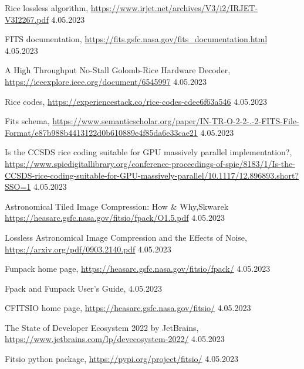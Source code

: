 \documentclass[licencjacka,en]{pracamgr}
\begin{document}
\begin{thebibliography}{99}

         {Rice lossless algorithm},
        \url{https://www.irjet.net/archives/V3/i2/IRJET-V3I2267.pdf} 4.05.2023

         {FITS documentation},
        \url{https://fits.gsfc.nasa.gov/fits_documentation.html} 4.05.2023

         {A High Throughput No-Stall Golomb-Rice Hardware Decoder},
        \url{https://ieeexplore.ieee.org/document/6545997} 4.05.2023 

         {Rice codes},
        \url{https://experiencestack.co/rice-codes-cdee6f63a546} 4.05.2023

         {Fits schema},
        \url{https://www.semanticscholar.org/paper/IN-TR-O-2-2-.-2-FITS-File-Format/e87b988b4413122d0b610889e4f85da6e33cae21} 4.05.2023
        
         {Is the CCSDS rice coding suitable for GPU massively parallel implementation?},
        \url{https://www.spiedigitallibrary.org/conference-proceedings-of-spie/8183/1/Is-the-CCSDS-rice-coding-suitable-for-GPU-massively-parallel/10.1117/12.896893.short?SSO=1} 4.05.2023 
        
         {Astronomical Tiled Image Compression: How \& Why},Skwarek
        \url{https://heasarc.gsfc.nasa.gov/fitsio/fpack/O1.5.pdf} 4.05.2023 
        
         {Lossless Astronomical Image Compression and the Effects of Noise},
        \url{https://arxiv.org/pdf/0903.2140.pdf} 4.05.2023 

         {Funpack home page},
        \url{https://heasarc.gsfc.nasa.gov/fitsio/fpack/} 4.05.2023 

         {Fpack and Funpack User's Guide},
        \url{} 4.05.2023 

         {CFITSIO home page},
        \url{https://heasarc.gsfc.nasa.gov/fitsio/} 4.05.2023

         {The State of Developer Ecosystem 2022 by JetBrains},
        \url{https://www.jetbrains.com/lp/devecosystem-2022/} 4.05.2023

         {Fitsio python package},
        \url{https://pypi.org/project/fitsio/} 4.05.2023


\end{thebibliography}
\end{document}
